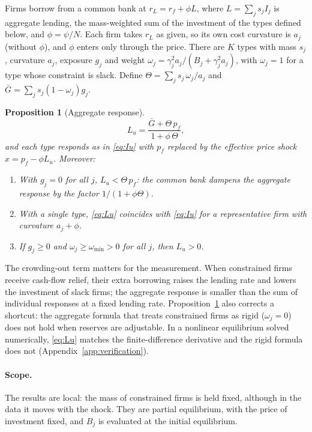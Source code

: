 \documentclass[11pt]{article}
\newtheorem{proposition}{Proposition}
\theoremstyle{remark}
\begin{document}
Firms borrow from a common bank at $r_L=r_f+\phi L$, where $L=\sum_j s_jI_j$ is aggregate lending, the
mass-weighted sum of the investment of the types defined below, and $\phi=\psi/N$. Each firm takes $r_L$ as
given, so its own cost curvature is $a_j$ (without $\phi$), and $\phi$ enters only through the price. There are $K$ types with
mass $s_j$, curvature $a_j$, exposure $g_j$ and weight $\omega_j=\gamma_j^2 a_j/(B_j+\gamma_j^2 a_j)$, with $\omega_j=1$ for a
type whose constraint is slack. Define $\Theta=\sum_j s_j\,\omega_j/a_j$ and $\bar G=\sum_j s_j(1-\omega_j)g_j$.

\begin{proposition}[Aggregate response]\label{prop:aggregation}
\begin{equation}\label{eq:Lu}
L_u=\frac{\bar G+\Theta\,p_f}{1+\phi\,\Theta},
\end{equation}
and each type responds as in \eqref{eq:Iu} with $p_f$ replaced by the effective price shock $x=p_f-\phi L_u$. Moreover:
\begin{enumerate}
\item[(i)] With $g_j=0$ for all $j$, $L_u<\Theta\,p_f$: the common bank dampens the aggregate response by the factor
$1/(1+\phi\Theta)$.
\item[(ii)] With a single type, \eqref{eq:Lu} coincides with \eqref{eq:Iu} for a representative firm with curvature
$a_j+\phi$.
\item[(iii)] If $g_j\ge0$ and $\omega_j\ge\omega_{\min}>0$ for all $j$, then $L_u>0$.
\end{enumerate}
\end{proposition}

The crowding-out term matters for the measurement. When constrained firms receive cash-flow relief, their extra borrowing raises
the lending rate and lowers the investment of slack firms; the aggregate response is smaller than the sum of individual
responses at a fixed lending rate. Proposition~\ref{prop:aggregation} also corrects a shortcut: the aggregate formula that treats
constrained firms as rigid ($\omega_j=0$) does not hold when reserves are adjustable. In a nonlinear equilibrium solved
numerically, \eqref{eq:Lu} matches the finite-difference derivative and the rigid formula does not
(Appendix~\ref{app:verification}).

\paragraph{Scope.} The results are local: the mass of constrained firms is held fixed, although in the data it moves with the
shock. They are partial equilibrium, with the price of investment fixed, and $B_j$ is evaluated at the initial equilibrium.
\end{document}

